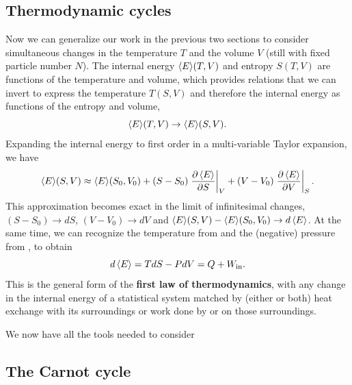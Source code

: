 \subsection{Thermodynamic cycles}
Now we can generalize our work in the previous two sections to consider simultaneous changes in the temperature $T$ and the volume $V$ (still with fixed particle number $N$).
The internal energy $\left\langle E \right\rangle\!(T, V)$ and entropy $S(T, V)$ are functions of the temperature and volume, which provides relations that we can invert to express the temperature $T(S, V)$ and therefore the internal energy as functions of the entropy and volume,
\begin{equation*}
  \left\langle E \right\rangle\!(T, V) \to \left\langle E \right\rangle\!(S, V).
\end{equation*}
Expanding the internal energy to first order in a multi-variable Taylor expansion, we have
\begin{equation*}
  \left\langle E \right\rangle\!(S, V) \approx \left\langle E \right\rangle\!(S_0, V_0) + (S - S_0) \left.\frac{\partial \left\langle E \right\rangle}{\partial S}\right|_V + (V - V_0) \left.\frac{\partial \left\langle E \right\rangle}{\partial V}\right|_S.
\end{equation*}
This approximation becomes exact in the limit of infinitesimal changes, $(S - S_0) \to dS$, $(V - V_0) \to dV$ and $\left\langle E \right\rangle\!(S, V) - \left\langle E \right\rangle\!(S_0, V_0) \to d\left\langle E \right\rangle$.
At the same time, we can recognize the temperature from  and the (negative) pressure from , to obtain
\begin{equation}
  d\left\langle E \right\rangle = T dS - P dV = Q + W_{\text{in}}.
\end{equation}
This is the general form of the \textbf{first law of thermodynamics}, with any change in the internal energy of a statistical system matched by (either or both) heat exchange with its surroundings or work done by or on those surroundings.

We now have all the tools needed to consider 




\newpage %
\subsection{The Carnot cycle}
